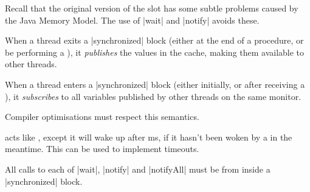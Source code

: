
\begin{slide}

Recall that the original version of the slot has some  subtle problems caused
by the Java Memory Model.  The use of |wait| and |notify| avoids
these. 

When a thread exits a |synchronized| block (either at the end of a
procedure, or be performing a ), it \emph{publishes} the
values in the cache, making them available to other threads.

When a thread enters a |synchronized| block (either initially, or after
receiving a ), it \emph{subscribes} to all variables
published by other threads on the same monitor.

Compiler optimisations must respect this
semantics.

\vfill
\end{slide}



\begin{slide}

 acts like , except it will wake up after
ms, if it hasn't been woken by a  in the meantime.
This can be used to implement timeouts.  




All calls to each of |wait|, |notify| and |notifyAll| must be from inside a
|synchronized| block.
\end{slide}
